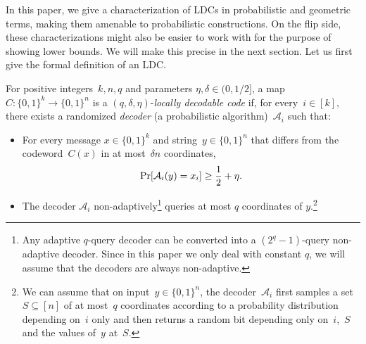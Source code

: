 \documentclass{toc}
\newcommand{\bset}[1]{\{0,1\}^{#1}} %
\renewcommand{\Pr}{\mbox{\rm Pr}}
\newcommand{\beq}{\begin{equation}}
\newcommand{\eeq}{\end{equation}}
\begin{document}
In this paper, we give a characterization of LDCs in probabilistic and geometric terms, making them amenable to probabilistic constructions. On the flip side, these characterizations might also be easier to work with for the purpose of showing lower bounds. We will make this precise in the next section.
Let us first give the formal definition of an LDC.

\begin{definition}\label{ldc:def}
For positive integers~$k, n,q$ and parameters $\eta,\delta\in (0,1/2]$, a map $C: \bset{k}\to\bset{n}$ is a $(q,\delta,\eta)$-\emph{locally decodable code} if, for every~$i\in[k]$, there exists a randomized \emph{decoder} (a probabilistic algorithm)~$\mathcal{A}_i$  such that:
 
\begin{itemize}
\item For every message $x\in\bset{k}$ and string~$y\in\bset{n}$ that differs from the codeword~$C(x)$ in at most~$\delta n$ coordinates,
\beq\label{eq:ldcdec}
\Pr[\mathcal A_i( y) = x_i] \geq \frac{1}{2} + \eta.
\eeq
\item The decoder $\mathcal{A}_i$ non-adaptively\footnote{Any adaptive $q$-query decoder can be converted into a $(2^q-1)$-query non-adaptive decoder. Since in this paper we only deal with constant $q$, we will assume that the decoders are always non-adaptive.} queries at most $q$ coordinates of $y$.\footnote{
We can assume that on input~$y\in\bset{n}$, the decoder~$\mathcal A_i$ first samples a set~$S\subseteq[n]$ of at most~$q$ coordinates according to a probability distribution depending on~$i$ only and then returns a random bit depending only on~$i$,~$S$ and the values of~$y$ at~$S$.
}
\end{itemize}
\end{definition}
\end{document}
